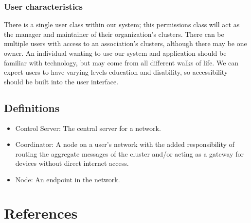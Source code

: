 \documentclass[tikz,a4paper,titlepage]{article}
\begin{document}
\subsubsection{User characteristics}
There is a single user class within our system; this permissions class will act as the manager and maintainer of their organization’s clusters. There can be multiple users with access to an association's clusters, although there may be one owner. An individual wanting to use our system and application should be familiar with technology, but may come from all different walks of life. We can expect users to have varying levels education and disability, so accessibility should be built into the user interface. 

\subsection{Definitions}
\begin{itemize}
    \item Control Server: The central server for a network.
    \item Coordinator: A node on a user's network with the added responsibility of routing the aggregate messages of the cluster and/or acting as a gateway for devices without direct internet access.
    \item Node: An endpoint in the network.
\end{itemize}

\section{References}

\begingroup
\renewcommand{\section}[2]{}%


\endgroup

\end{document}
